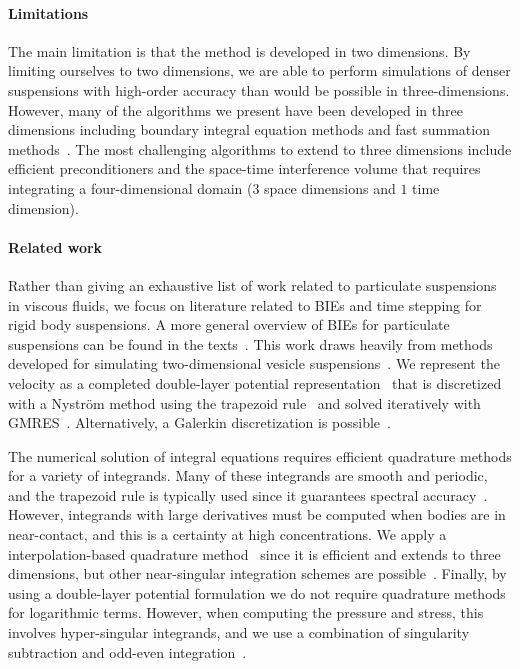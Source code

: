 \documentclass[preprint, 10pt]{elsarticle}
\begin{document}
\paragraph{Limitations} The main limitation is that the method is
developed in two dimensions.  By limiting ourselves to two dimensions,
we are able to perform simulations of denser suspensions with high-order
accuracy than would be possible in three-dimensions.  However, many of
the algorithms we present have been developed in three dimensions
including boundary integral equation methods and fast summation
methods~\cite{cor-gre-rac-vee2017, kli-tor2014, kli-tor2016}.  The most
challenging algorithms to extend to three dimensions include efficient
preconditioners and the space-time interference volume that requires
integrating a four-dimensional domain ($3$ space dimensions and $1$ time
dimension).


\paragraph{Related work} Rather than giving an exhaustive list of work
related to particulate suspensions in viscous fluids, we focus on
literature related to BIEs and time stepping for rigid body suspensions.
A more general overview of BIEs for particulate suspensions can be found
in the texts~\cite{Pozrikidis1992, Guazzelli2011, Karrila1991}.  This
work draws heavily from methods developed for simulating two-dimensional
vesicle suspensions~\cite{Quaife2014, Quaife2015, qua-bir2016,
Rahimian2010, Lu2017}.  We represent the velocity as a completed
double-layer potential representation~\cite{Power1987, Power1993,
Karrila1989} that is discretized with a Nystr\"om method using the
trapezoid rule~\cite{Trefethan2014} and solved iteratively with
GMRES~\cite{Saad1986}.  Alternatively, a Galerkin discretization is
possible~\cite{Mammoli1999, Mammoli2002, Mammoli2006}.

The numerical solution of integral equations requires efficient
quadrature methods for a variety of integrands.  Many of these
integrands are smooth and periodic, and the trapezoid rule is typically
used since it guarantees spectral accuracy~\cite{Trefethan2014}.
However, integrands with large derivatives must be computed when bodies
are in near-contact, and this is a certainty at high concentrations.  We
apply a interpolation-based quadrature method~\cite{Ying2006,
Quaife2014} since it is efficient and extends to three dimensions, but
other near-singular integration schemes are possible~\cite{Klockner2013,
Barnett2015, Beale2016, Helsing2008, Kropinski1999, Mammoli2006,
Siegel2018}.  Finally, by using a double-layer potential formulation we
do not require quadrature methods for logarithmic terms.  However, when
computing the pressure and stress, this involves hyper-singular
integrands, and we use a combination of singularity subtraction and
odd-even integration~\cite{sid-isr1988, Quaife2014}.
\end{document}
